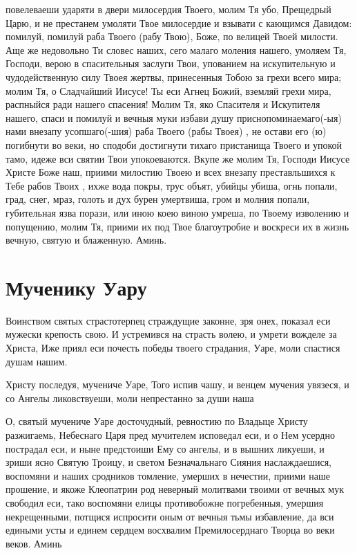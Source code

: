 \begin{mymulticols}
повелеваеши ударяти в двери милосердия Твоего, молим Тя убо, Прещедрый Царю, и не престанем умоляти Твое милосердие и взывати с кающимся Давидом: помилуй, помилуй раба Твоего (рабу Твою), Боже, по велицей Твоей милости. Аще же недовольно Ти словес наших, сего малаго моления нашего, умоляем Тя, Господи, верою в спасительныя заслуги Твои, упованием на искупительную и чудодейственную силу Твоея жертвы, принесенныя Тобою за грехи всего мира; молим Тя, о Сладчайший Иисусе! Ты еси Агнец Божий, вземляй грехи мира, распныйся ради нашего спасения! Молим Тя, яко Спасителя и Искупителя нашего, спаси и помилуй и вечныя муки избави душу приснопоминаемаго(-ыя) нами внезапу усопшаго(-шия) раба Твоего (рабы Твоея) , не остави его (ю) погибнути во веки, но сподоби достигнути тихаго пристанища Твоего и упокой тамо, идеже вси святии Твои упокоеваются. Вкупе же молим Тя, Господи Иисусе Христе Боже наш, приими милостию Твоею и всех внезапу преставльшихся к Тебе рабов Твоих , ихже вода покры, трус объят, убийцы убиша, огнь попали, град, снег, мраз, голоть и дух бурен умертвиша, гром и молния попали, губительная язва порази, или иною коею виною умреша, по Твоему изволению и попущению, молим Тя, приими их под Твое благоутробие и воскреси их в жизнь вечную, святую и блаженную. Аминь.

\end{mymulticols}

\mychapterending



\section{Мученику Уару}\begin{mymulticols}


Воинством святых страстотерпец страждущие законне, зря онех, показал еси мужески крепость свою. И устремився на страсть волею, и умрети вожделе за Христа, Иже приял еси почесть победы твоего страдания, Уаре, моли спастися душам нашим.


Христу последуя, мучениче Уаре, Того испив чашу, и венцем мучения увязеся, и со Ангелы ликовствуеши, моли непрестанно за души наша


О, святый мучениче Уаре досточудный, ревностию по Владыце Христу разжигаемь, Небеснаго Царя пред мучителем исповедал еси, и о Нем усердно пострадал еси, и ныне предстоиши Ему со ангелы, и в вышних ликуеши, и зриши ясно Святую Троицу, и светом Безначальнаго Сияния наслаждаешися, воспомяни и наших сродников томление, умерших в нечестии, приими наше прошение, и якоже Клеопатрин род неверный молитвами твоими от вечных мук свободил еси, тако воспомяни елицы противобожне погребенныя, умершия некрещенными, потщися испросити оным от вечныя тьмы избавление, да вси едиными усты и единем сердцем восхвалим Премилосерднаго Творца во веки веков. Аминь

\end{mymulticols}

